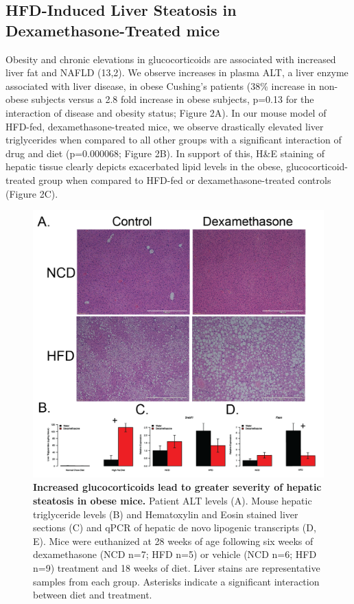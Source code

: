 \documentclass[11pt]{article} %
\begin{document}
\subsection*{HFD-Induced Liver Steatosis in Dexamethasone-Treated
mice}\label{hfd-induced-liver-steatosis-in-dexamethasone-treated-mice}

Obesity and chronic elevations in glucocorticoids are associated with
increased liver fat and NAFLD (13,2). We observe increases in plasma
ALT, a liver enzyme associated with liver disease, in obese Cushing's
patients (38\% increase in non-obese subjects versus a 2.8 fold increase
in obese subjects, p=0.13 for the interaction of disease and obesity
status; Figure 2A). In our mouse model of HFD-fed, dexamethasone-treated
mice, we observe drastically elevated liver triglycerides when compared
to all other groups with a significant interaction of drug and diet
(p=0.000068; Figure 2B). In support of this, H\&E staining of hepatic
tissue clearly depicts exacerbated lipid levels in the obese,
glucocorticoid-treated group when compared to HFD-fed or
dexamethasone-treated controls (Figure 2C).

\begin{figure}
  \begin{center}
    \includegraphics[width=\textwidth]{Figures_Figure_2.png}
  \end{center}
  \caption{\textbf{Increased glucocorticoids lead to greater severity of hepatic steatosis in obese mice.}
Patient ALT levels (A). Mouse hepatic triglyceride levels (B) and Hematoxylin and Eosin stained liver sections (C) and qPCR of hepatic de novo lipogenic transcripts (D, E). Mice were euthanized at 28 weeks of age following six weeks of dexamethasone (NCD n=7; HFD n=5) or vehicle (NCD n=6; HFD n=9) treatment and 18 weeks of diet. Liver stains are representative samples from each group. Asterisks indicate a significant interaction between diet and treatment.}
 \label{fig:2}
\end{figure}
\end{document}
